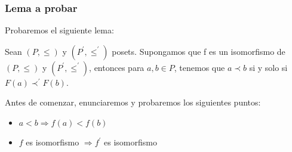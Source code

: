 \begin{frame}
	\frametitle{Lema a probar}

	\PN Probaremos el siguiente lema:

	\vspace{3mm}
	\begin{lemma}{}
		\PN Sean $(P, \leq)$ y $(P^{\prime}, \leq^{\prime})$ posets. Supongamos que f es un isomorfismo de $(P, \leq)$ y
		$(P^{\prime}, \leq^{\prime})$, entonces para $a, b \in P$, tenemos que $a \prec b$ si y solo si $F(a) \prec^{\prime}
		F(b)$.
	\end{lemma}

	\vspace{7mm}
	\PN Antes de comenzar, enunciaremos y probaremos los siguientes puntos:
	\begin{itemize}
		\item $a < b \Rightarrow f(a) < f(b)$
		\item $f$ es isomorfismo $\Rightarrow f^{\prime}$ es isomorfismo
	\end{itemize}

\end{frame}
